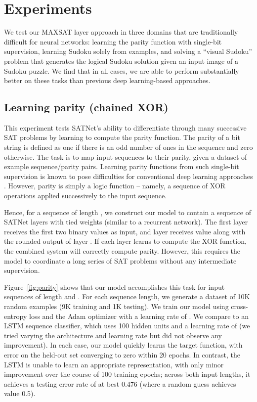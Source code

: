 \documentclass{article}
\begin{document}
	\section{Experiments}
	
	We test our MAXSAT layer approach in three domains that are traditionally difficult for neural networks: learning the parity function with single-bit supervision, learning  Sudoku solely from examples, and solving a ``visual Sudoku'' problem that generates the logical Sudoku solution given an input image of a Sudoku puzzle.
	We find that in all cases, we are able to perform substantially better on these tasks than previous deep learning-based approaches.
	
	
	\subsection{Learning parity (chained XOR)}


	This experiment tests SATNet's ability to differentiate through many successive SAT problems by learning to compute the parity function. 
	The parity of a bit string is defined as one if there is an odd number of ones in the sequence and zero otherwise. 
	The task is to map input sequences to their parity, given a dataset of example sequence/parity pairs. Learning parity functions from such single-bit supervision is known to pose difficulties for conventional deep learning approaches \cite{shalev2017failures}. 
	However, parity is simply a logic function -- namely, a sequence of XOR operations applied successively to the input sequence.
	
Hence, for a sequence of length , we construct our model to contain a sequence of  SATNet layers with tied weights (similar to a recurrent network). 
	The first layer receives the first two binary values as input, and layer  receives value  along with the rounded output of layer . If each layer learns to compute the XOR function, the combined system will correctly compute parity. 
	However, this requires the model to coordinate a long series of SAT problems without any intermediate supervision. 
	
	Figure~\ref{fig:parity}  shows that our model accomplishes this task for input sequences of length  and .
	For each sequence length, we generate a dataset of 10K random examples (9K training and 1K testing). 
	We train our model using cross-entropy loss and the Adam optimizer \cite{kingma2015adam} with a learning rate of . 
	We compare to an LSTM sequence classifier, which uses 100 hidden units and a learning rate of  (we tried varying the architecture and learning rate but did not observe any improvement). 
	In each case, our model quickly learns the target function, with error on the held-out set converging to zero within 20 epochs. 
	In contrast, the LSTM is unable to learn an appropriate representation, with only minor improvement over the course of 100 training epochs; across both input lengths, it achieves a testing error rate of at best 0.476 (where a random guess achieves value 0.5).   
	
\end{document}
